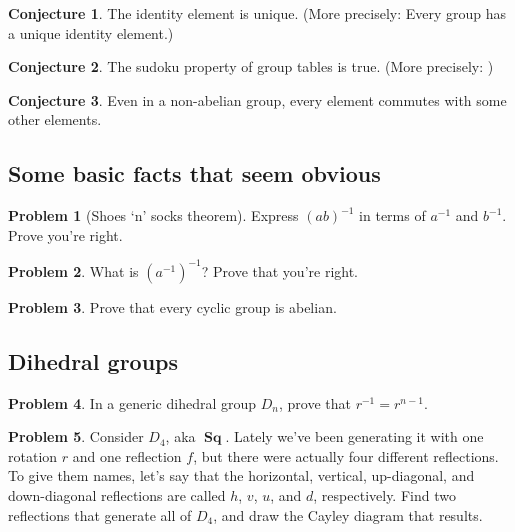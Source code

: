 \documentclass[12pt]{article}
\theoremstyle{definition} %
\newtheorem{conjecture}{Conjecture}
\newtheorem{problem}{Problem}
\newcommand\inv{^{-1}} %
\DeclareMathOperator\Sq{\mathbf{Sq}}
\begin{document}
\begin{conjecture}
    The identity element is unique. (More precisely: Every group has a unique identity element.)
\end{conjecture}

\begin{conjecture}
    The sudoku property of group tables is true. (More precisely: \underline{\hspace{1in}})
\end{conjecture}

\begin{conjecture}
    Even in a non-abelian group, every element commutes with some other elements.
\end{conjecture}

\subsection*{Some basic facts that seem obvious}

\begin{problem}[Shoes `n' socks theorem]
    \label{sns}
    Express $(ab)\inv$ in terms of $a\inv$ and $b\inv$. Prove you're right.
\end{problem}

\begin{problem}
    What is $(a\inv)\inv$? Prove that you're right.
\end{problem}

\begin{problem}
    Prove that every cyclic group is abelian.
\end{problem}

\subsection*{Dihedral groups}

\begin{problem}
    In a generic dihedral group $D_n$, prove that $r\inv = r^{n-1}$.
\end{problem}

\begin{problem}
    Consider $D_4$, aka $\Sq$. Lately we've been generating it with one rotation $r$ and one reflection $f$, but there were actually four different reflections. To give them names, let's say that the horizontal, vertical, up-diagonal, and down-diagonal reflections are called $h$, $v$, $u$, and $d$, respectively. Find two reflections that generate all of $D_4$, and draw the Cayley diagram that results.
\end{problem}
\end{document}
